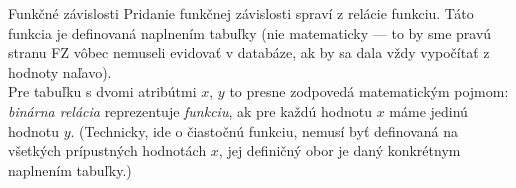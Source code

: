 \documentclass[12pt]{beamer}
\begin{document}


\begin{frame}[fragile]{Funkčné závislosti}
Pridanie funkčnej závislosti spraví z relácie funkciu. Táto funkcia je definovaná naplnením tabuľky (nie matematicky ---
to by sme pravú stranu FZ vôbec nemuseli evidovať v databáze, ak by sa dala vždy vypočítať z hodnoty naľavo).
\\[5mm]

Pre tabuľku s dvomi atribútmi $x$, $y$ to presne zodpovedá matematickým pojmom:
\emph{binárna relácia} reprezentuje \emph{funkciu}, ak pre každú hodnotu $x$ máme jedinú hodnotu $y$.
(Technicky, ide o čiastočnú funkciu, nemusí byť definovaná na všetkých prípustných hodnotách $x$,
jej definičný obor je daný konkrétnym naplnením tabuľky.)
\end{frame}
\end{document}
